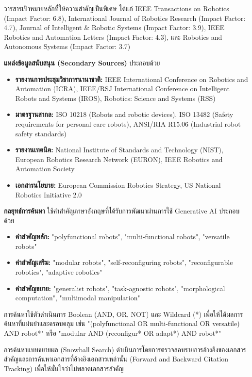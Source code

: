 \documentclass[a4paper]{article}
\begin{document}
วารสารเป้าหมายหลักที่ให้ความสำคัญเป็นพิเศษ ได้แก่ IEEE Transactions on Robotics (Impact Factor: 6.8), International Journal of Robotics Research (Impact Factor: 4.7), Journal of Intelligent \& Robotic Systems (Impact Factor: 3.9), IEEE Robotics and Automation Letters (Impact Factor: 4.3), และ Robotics and Autonomous Systems (Impact Factor: 3.7)

\textbf{แหล่งข้อมูลสนับสนุน (Secondary Sources)} ประกอบด้วย
\begin{itemize}
\item \textbf{รายงานการประชุมวิชาการนานาชาติ:} IEEE International Conference on Robotics and Automation (ICRA), IEEE/RSJ International Conference on Intelligent Robots and Systems (IROS), Robotics: Science and Systems (RSS)
\item \textbf{มาตรฐานสากล:} ISO 10218 (Robots and robotic devices), ISO 13482 (Safety requirements for personal care robots), ANSI/RIA R15.06 (Industrial robot safety standards)
\item \textbf{รายงานเทคนิค:} National Institute of Standards and Technology (NIST), European Robotics Research Network (EURON), IEEE Robotics and Automation Society
\item \textbf{เอกสารนโยบาย:} European Commission Robotics Strategy, US National Robotics Initiative 2.0
\end{itemize}

\textbf{กลยุทธ์การค้นหา} ใช้คำสำคัญภาษาอังกฤษที่ได้รับการพัฒนาผ่านการใช้ Generative AI ประกอบด้วย
\begin{itemize}
\item \textbf{คำสำคัญหลัก:} "polyfunctional robots", "multi-functional robots", "versatile robots"
\item \textbf{คำสำคัญเสริม:} "modular robots", "self-reconfiguring robots", "reconfigurable robotics", "adaptive robotics"
\item \textbf{คำสำคัญขยาย:} "generalist robots", "task-agnostic robots", "morphological computation", "multimodal manipulation"
\end{itemize}

การค้นหาใช้ตัวดำเนินการ Boolean (AND, OR, NOT) และ Wildcard (*) เพื่อให้ได้ผลการค้นหาที่แม่นยำและครอบคลุม เช่น "(polyfunctional OR multi-functional OR versatile) AND robot*" หรือ "modular AND (reconfigur* OR adapt*) AND robot*"

การค้นหาแบบขยายผล (Snowball Search) ดำเนินการโดยการตรวจสอบรายการอ้างอิงของเอกสารสำคัญและการค้นหาเอกสารที่อ้างอิงเอกสารเหล่านั้น (Forward and Backward Citation Tracking) เพื่อให้มั่นใจว่าไม่พลาดเอกสารสำคัญ
\end{document}
